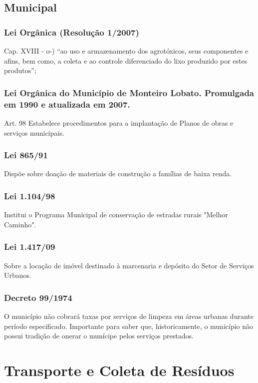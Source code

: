 \begin{subapend}
	\subsection{Municipal}
	\begin{subsubapend}
		\subsubsection{Lei Orgânica (Resolução 1/2007)}
		Cap. XVIII - o-) “ao uso e armazenamento dos agrotóxicos, seus componentes e afins, bem como, a coleta e ao controle diferenciado do lixo produzido por estes produtos”;
		\subsubsection{Lei Orgânica do Município de Monteiro Lobato. Promulgada em 1990 e atualizada em 2007.}
		Art. 98
		Estabelece procedimentos para a implantação de Planos de obras e serviços municipais.
		\subsubsection{Lei 865/91}
		Dispõe sobre doação de materiais de construção a famílias de baixa renda.
		\subsubsection{Lei 1.104/98}
		Institui o Programa Municipal de conservação de estradas rurais "Melhor Caminho".
		\subsubsection{Lei 1.417/09}
		Sobre a locação de imóvel destinado à marcenaria e depósito do Setor de Serviços Urbanos.
		\subsubsection{Decreto 99/1974}
		O município não cobrará taxas por serviços de limpeza em áreas urbanas durante período especificado. Importante para saber que, historicamente, o município não possui tradição de onerar o munícipe pelos serviços prestados.
	\end{subsubapend}
\end{subapend}

\section{Transporte e Coleta de Resíduos}

